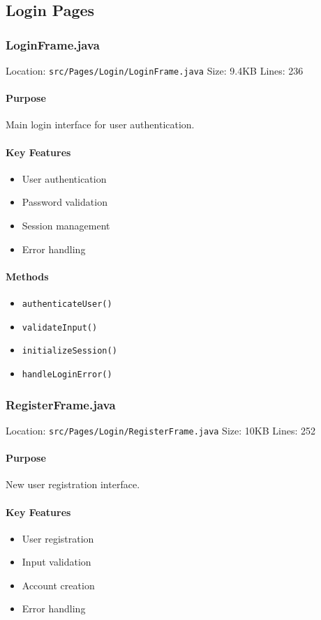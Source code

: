 \documentclass[12pt,a4paper]{article}
\begin{document}
\subsection{Login Pages}
\subsubsection{LoginFrame.java}
Location: \texttt{src/Pages/Login/LoginFrame.java}
Size: 9.4KB
Lines: 236

\paragraph{Purpose}
Main login interface for user authentication.

\paragraph{Key Features}
\begin{itemize}
    \item User authentication
    \item Password validation
    \item Session management
    \item Error handling
\end{itemize}

\paragraph{Methods}
\begin{itemize}
    \item \texttt{authenticateUser()}
    \item \texttt{validateInput()}
    \item \texttt{initializeSession()}
    \item \texttt{handleLoginError()}
\end{itemize}

\subsubsection{RegisterFrame.java}
Location: \texttt{src/Pages/Login/RegisterFrame.java}
Size: 10KB
Lines: 252

\paragraph{Purpose}
New user registration interface.

\paragraph{Key Features}
\begin{itemize}
    \item User registration
    \item Input validation
    \item Account creation
    \item Error handling
\end{itemize}
\end{document}
